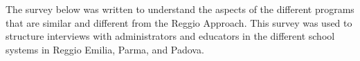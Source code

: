 The survey below was written to understand the aspects of the different programs that are similar and different from the Reggio Approach. This survey was used to structure interviews with administrators and educators in the different school systems in Reggio Emilia, Parma, and Padova. 

